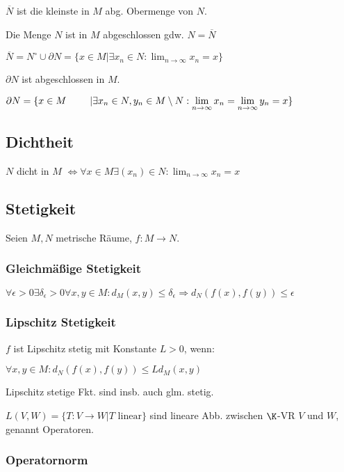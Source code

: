 $\overline N$ ist die kleinste in $M$ abg. Obermenge von $N$.

Die Menge $N$ ist in $M$ abgeschlossen gdw. $N = \overline N$

$\overline N = N^\circ \cup \partial N = \{x \in M | \exists x_n \in N : \lim_{n \to \infty} x_n = x \}$

$\partial N$ ist abgeschlossen in $M$.

$\partial N = \{ x \in M \\ \hspace*{8.5mm} | \exists x_n \in N, y_n \in M \setminus N : \displaystyle\lim_{n \to \infty} x_n = \displaystyle\lim_{n \to \infty} y_n = x \}$

\subsection*{Dichtheit}

$N$ dicht in $M$ $\Leftrightarrow \forall x \in M \exists (x_n) \in N : \displaystyle\lim_{n \to \infty} x_n = x$

\subsection*{Stetigkeit}

Seien $M, N$ metrische Räume, $f : M \rightarrow N$.

\subsubsection*{Gleichmäßige Stetigkeit}

$\forall \epsilon > 0 \exists \delta_\epsilon > 0 \forall x, y \in M : d_M(x, y) \leq \delta_\epsilon \Rightarrow d_N(f(x), f(y)) \leq \epsilon$

\subsubsection*{Lipschitz Stetigkeit}

$f$ ist Lipschitz stetig mit Konstante $L > 0$, wenn:

$\forall x, y \in M : d_N(f(x), f(y)) \leq L d_M(x, y)$

Lipschitz stetige Fkt. sind insb. auch glm. stetig.

$L(V, W) = \{T : V \rightarrow W | T \text{ linear} \}$ sind lineare Abb. zwischen $\K$-VR $V$ und $W$, genannt Operatoren.

\subsubsection*{Operatornorm}

